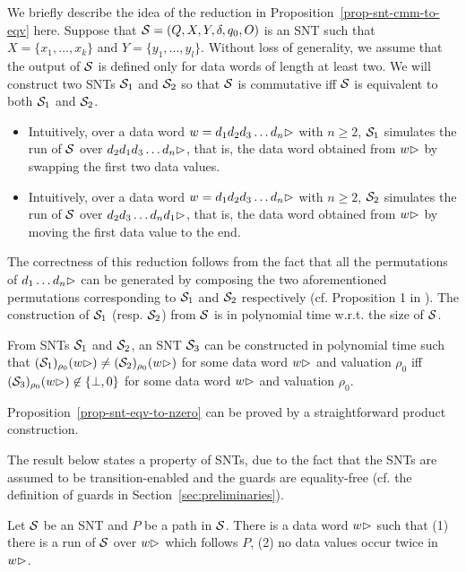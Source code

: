 We briefly describe the idea of the reduction in Proposition~\ref{prop-snt-cmm-to-eqv} here. Suppose that ${\mathcal{S} }=(Q, X, Y, \delta, q_0, O)$ is an SNT such that $X=\{x_1,\dots,x_k\}$ and $Y=\{y_1,\dots,y_l\}$. Without loss of generality, we assume that the output of ${\mathcal{S} }$ is defined only for data words of length at least two. We will construct two SNTs ${\mathcal{S} }_1$ and ${\mathcal{S} }_2$ so that ${\mathcal{S} }$ is commutative iff ${\mathcal{S} }$ is equivalent to both ${\mathcal{S} }_1$ and ${\mathcal{S} }_2$.
\begin{itemize}
\item Intuitively, over a data word $w=d_1 d_2 d_3 \dots d_n\rhd$ with $n\ge 2$, ${\mathcal{S} }_1$ simulates the run of ${\mathcal{S} }$ over $d_2 d_1 d_3 \dots d_n\rhd$, that is, the data word obtained from $w\rhd$ by swapping the first two data values.
%
\item Intuitively, over a data word $w=d_1 d_2 d_3 \dots d_n\rhd$ with $n\ge 2$, ${\mathcal{S} }_2$ simulates the run of ${\mathcal{S} }$ over $d_2 d_3 \dots d_n d_1\rhd$, that is, the data word obtained from $w\rhd$ by moving the first data value to the end. 
\end{itemize}
The correctness of this reduction follows from the fact that all the permutations of $d_1\dots d_n\rhd$ can be generated by composing the two aforementioned permutations corresponding to ${\mathcal{S} }_1$ and ${\mathcal{S} }_2$ respectively (cf. Proposition 1 in \cite{CHSW15}). The construction of ${\mathcal{S} }_1$ (resp. ${\mathcal{S} }_2$) from ${\mathcal{S} }$ is in  polynomial time w.r.t. the size of ${\mathcal{S} }$.

\begin{proposition}\label{prop-snt-eqv-to-nzero}
From SNTs ${\mathcal{S} }_1$ and ${\mathcal{S} }_2$, an SNT ${\mathcal{S} }_3$ can be constructed in polynomial time such that  $({\mathcal{S} }_1)_{\rho_0}(w\rhd) \neq ({\mathcal{S} }_2)_{\rho_0}(w\rhd)$ for some  data word $w\rhd$ and valuation $\rho_0$  iff $({\mathcal{S} }_3)_{\rho_0}(w\rhd) \not\in \{\bot,0\}$ for some data word $w\rhd$ and valuation $\rho_0$. 
\end{proposition}
Proposition~\ref{prop-snt-eqv-to-nzero} can be proved by a straightforward product construction.

The result below states a property of SNTs, due to the fact that the SNTs are assumed to be transition-enabled and the guards are equality-free (cf. the definition of guards in Section~\ref{sec:preliminaries}).

\begin{proposition}\label{prop-snt-distinct-value}
Let ${\mathcal{S} }$ be an SNT and $P$ be a path in ${\mathcal{S} }$. There is a data word $w\rhd$ such that (1) there is a run of ${\mathcal{S} }$ over $w\rhd$ which follows $P$, (2) no data values occur twice in~$w\rhd$.
\end{proposition}



